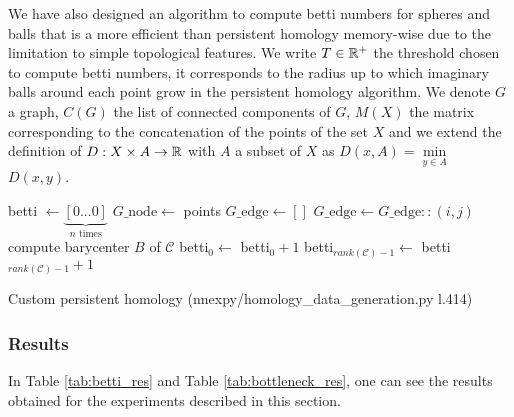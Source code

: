 \documentclass[12pt, a4paper]{article}
\begin{document}
We have also designed an algorithm to compute betti numbers for spheres and balls that is a more efficient than persistent homology memory-wise due to the limitation to simple topological features. We write $T \in \mathbb{R}^+$ the threshold chosen to compute betti numbers, it corresponds to the radius up to which imaginary balls around each point grow in the persistent homology algorithm. We denote $G$ a graph, $C(G)$ the list of connected components of $G$, $M(X)$ the matrix corresponding to the concatenation of the points of the set $X$ and we extend the definition of $D: X \times A \to \mathbb{R}$ with $A$ a subset of $X$ as $D(x,A) = \underset{y \in A}{\min}$ $D(x,y)$.

\begin{algorithm}[H]
  \begin{algorithmic}[1]
    \STATE betti $\gets \underbrace{[0 ... 0]}_{n \text{ times}}$
    \STATE $G\_\text{node} \gets$ points
    \STATE $G\_\text{edge} \gets []$
    \STATE $G\_\text{edge} \gets G\_\text{edge}::(i,j)$
    \ENDIF
    \ENDFOR
    \STATE compute barycenter $B$ of $\mathcal{C}$
    \STATE betti$_0 \gets$ betti$_0 + 1$
    \ELSE
    \STATE betti$_{rank(\mathcal{C}) - 1} \gets$ betti$_{rank(\mathcal{C}) - 1} + 1$
    \ENDIF
    \ENDFOR
  \end{algorithmic}
\caption{Custom persistent homology ({\selectfont nnexpy/homology\_data\_generation.py l.414})}
\end{algorithm}

\subsubsection{Results}

\label{sec:homology_results}

In Table \ref{tab:betti_res} and Table \ref{tab:bottleneck_res}, one can see the results obtained for the experiments described in this section. 
\end{document}
